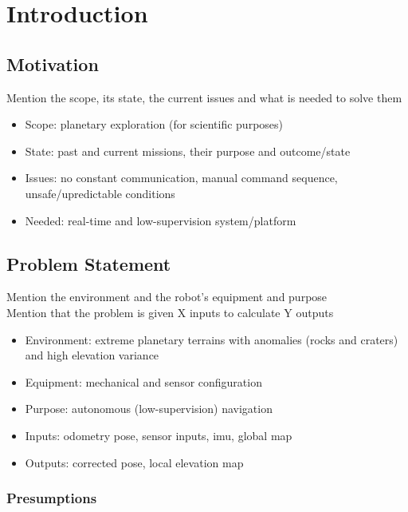 \label{Chapter1}

\chapter{Introduction}

\section{Motivation}

Mention the scope, its state, the current issues and what is needed to
solve them

\begin{itemize}
    \item Scope: planetary exploration (for scientific purposes)
    \item State: past and current missions, their purpose and outcome/state
    \item Issues: no constant communication, manual command sequence, unsafe/upredictable conditions
    \item Needed: real-time and low-supervision system/platform
\end{itemize}

\section{Problem Statement}

Mention the environment and the robot's equipment and purpose\\
Mention that the problem is given X inputs to calculate Y outputs

\begin{itemize}
    \item Environment: extreme planetary terrains with anomalies (rocks and craters) and high elevation variance
    \item Equipment: mechanical and sensor configuration
    \item Purpose: autonomous (low-supervision) navigation
    \item Inputs: odometry pose, sensor inputs, imu, global map
    \item Outputs: corrected pose, local elevation map
\end{itemize}

\subsection{Presumptions}

